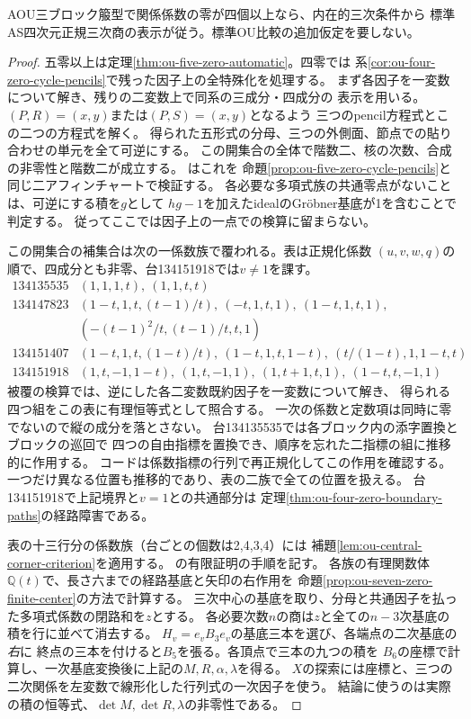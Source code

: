 \begin{theorem}[四零以上の全係数での比較仮定の除去]
\label{thm:ou-four-zero-automatic}
AOU三ブロック箙型で関係係数の零が四個以上なら、内在的三次条件から
標準AS四次元正規三次商の表示が従う。標準OU比較の追加仮定を要しない。
\end{theorem}
\begin{proof}
五零以上は定理\ref{thm:ou-five-zero-automatic}。四零では
系\ref{cor:ou-four-zero-cycle-pencils}で残った因子上の全特殊化を処理する。
まず各因子を一変数について解き、残りの二変数上で同系の三成分・四成分の
表示を用いる。$(P,R)=(x,y)$または$(P,S)=(x,y)$となるよう
三つのpencil方程式とこの二つの方程式を解く。
得られた五形式の分母、三つの外側面、節点での貼り合わせの単元を全て可逆にする。
この開集合の全体で階数二、核の次数、合成の非零性と階数二が成立する。
はこれを
命題\ref{prop:ou-five-zero-cycle-pencils}と同じ二アフィンチャートで検証する。
各必要な多項式族の共通零点がないことは、可逆にする積を$g$として
$hg-1$を加えたidealのGröbner基底が1を含むことで判定する。
従ってここでは因子上の一点での検算に留まらない。

この開集合の補集合は次の一係数族で覆われる。表は正規化係数
$(u,v,w,q)$の順で、四成分とも非零、台134151918では$v\ne1$を課す。
\[
\begin{array}{c|l}
134135535&(1,1,1,t),\ (1,1,t,t)\\
134147823&(1-t,1,t,(t-1)/t),\ (-t,1,t,1),\ (1-t,1,t,1),\\
 & (-(t-1)^2/t,(t-1)/t,t,1)\\
134151407&(1-t,1,t,(1-t)/t),\ (1-t,1,t,1-t),\ (t/(1-t),1,1-t,t)\\
134151918&(1,t,-1,1-t),\ (1,t,-1,1),\ (1,t+1,t,1),\ (1-t,t,-1,1)
\end{array}
\]
被覆の検算では、逆にした各二変数既約因子を一変数について解き、
得られる四つ組をこの表に有理恒等式として照合する。
一次の係数と定数項は同時に零でないので縦の成分を落とさない。
台134135535では各ブロック内の添字置換とブロックの巡回で
四つの自由指標を置換でき、順序を忘れた二指標の組に推移的に作用する。
コードは係数指標の行列で再正規化してこの作用を確認する。
一つだけ異なる位置も推移的であり、表の二族で全ての位置を扱える。
台134151918で上記境界と$v=1$との共通部分は
定理\ref{thm:ou-four-zero-boundary-paths}の経路障害である。

表の十三行分の係数族（台ごとの個数は2,4,3,4）には
補題\ref{lem:ou-central-corner-criterion}を適用する。
の有限証明の手順を記す。
各族の有理関数体$\mathbb Q(t)$で、長さ六までの経路基底と矢印の右作用を
命題\ref{prop:ou-seven-zero-finite-center}の方法で計算する。
三次中心の基底を取り、分母と共通因子を払った多項式係数の閉路和を$z$とする。
各必要次数$n$の商は$z$と全ての$n-3$次基底の積を行に並べて消去する。
$H_v=e_vB_3 e_v$の基底三本を選び、各端点の二次基底の\emph{右}に
終点の三本を付けると$B_5$を張る。各頂点で三本の九つの積を
$B_6$の座標で計算し、一次基底変換後に上記の$M,R,\alpha,\lambda$を得る。
$X$の探索には座標と、三つの二次関係を左変数で線形化した行列式の一次因子を使う。
結論に使うのは実際の積の恒等式、$\det M,\det R,\lambda$の非零性である。


\end{proof}
